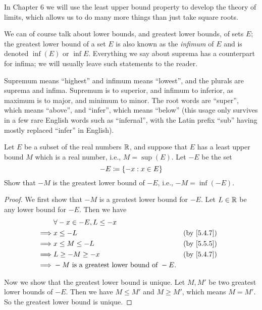 \begin{rmk}\label{5.5.14}
  In Chapter 6 we will use the least upper bound property to develop the theory of limits, which allows us to do many more things than just take square roots.
\end{rmk}

\begin{rmk}\label{5.5.15}
  We can of course talk about lower bounds, and greatest lower bounds, of sets \(E\);
  the greatest lower bound of a set \(E\) is also known as the \emph{infimum} of \(E\) and is denoted \(\inf(E)\) or \(\inf E\).
  Everything we say about suprema has a counterpart for infima;
  we will usually leave such statements to the reader.
\end{rmk}

\begin{note}
  Supremum means ``highest'' and infimum means ``lowest'', and the plurals are suprema and infima.
  Supremum is to superior, and infimum to inferior, as maximum is to major, and minimum to minor.
  The root words are ``super'', which means ``above'', and ``infer'', which means ``below''
  (this usage only survives in a few rare English words such as ``infernal'', with the Latin prefix ``sub'' having mostly replaced ``infer'' in English).
\end{note}

\exercisesection

\begin{ex}\label{ex:5.5.1}
  Let \(E\) be a subset of the real numbers \(\mathbb{R}\), and suppose that \(E\) has a least upper bound \(M\) which is a real number, i.e., \(M = \sup(E)\).
  Let \(-E\) be the set
  \[
    -E \coloneqq \left\lbrace-x : x \in E\right\rbrace
  \]
  Show that \(-M\) is the greatest lower bound of \(-E\), i.e., \(-M = \inf(-E)\).
\end{ex}

\begin{proof}
  We first show that \(-M\) is a greatest lower bound for \(-E\).
  Let \(L \in \mathbb{R}\) be any lower bound for \(-E\).
  Then we have
  \begin{align*}
             & \forall -x \in -E, L \leq -x                                 \\
    \implies & x \leq -L                                    &  & \by{5.4.7} \\
    \implies & x \leq M \leq -L                             &  & \by{5.5.5} \\
    \implies & L \geq -M \geq -x                            &  & \by{5.4.7} \\
    \implies & -M \text{ is a greatest lower bound of } -E.
  \end{align*}

  Now we show that the greatest lower bound is unique.
  Let \(M, M'\) be two greatest lower bounds of \(-E\).
  Then we have \(M \leq M'\) and \(M \geq M'\), which means \(M = M'\).
  So the greatest lower bound is unique.
\end{proof}

